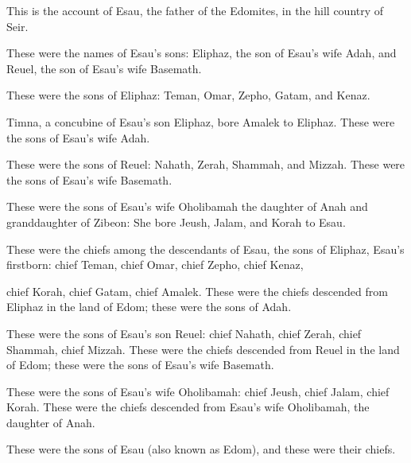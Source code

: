 \begin{scripture}
 This is the account of Esau, the father of the Edomites, in the hill country of Seir.
\everypar{}

 These were the names of Esau's sons: Eliphaz, the son of Esau's wife Adah, and Reuel, the son of Esau's wife Basemath.
\everypar{}

 These were the sons of Eliphaz: Teman, Omar, Zepho, Gatam, and Kenaz.
\everypar{}

 Timna, a concubine of Esau's son Eliphaz, bore Amalek to Eliphaz. These were the sons of Esau's wife Adah.
\everypar{}

 These were the sons of Reuel: Nahath, Zerah, Shammah, and Mizzah. These were the sons of Esau's wife Basemath.
\everypar{}

 These were the sons of Esau's wife Oholibamah the daughter of Anah and granddaughter of Zibeon: She bore Jeush, Jalam, and Korah to Esau.
\everypar{}

 These were the chiefs among the descendants of Esau, the sons of Eliphaz, Esau's firstborn: chief Teman, chief Omar, chief Zepho, chief Kenaz,
 chief Korah, chief Gatam, chief Amalek. These were the chiefs descended from Eliphaz in the land of Edom; these were the sons of Adah.
\everypar{}

 These were the sons of Esau's son Reuel: chief Nahath, chief Zerah, chief Shammah, chief Mizzah. These were the chiefs descended from Reuel in the land of Edom; these were the sons of Esau's wife Basemath.
\everypar{}

 These were the sons of Esau's wife Oholibamah: chief Jeush, chief Jalam, chief Korah. These were the chiefs descended from Esau's wife Oholibamah, the daughter of Anah.
\everypar{}

 These were the sons of Esau (also known as Edom), and these were their chiefs.
\everypar{}


\end{scripture}
